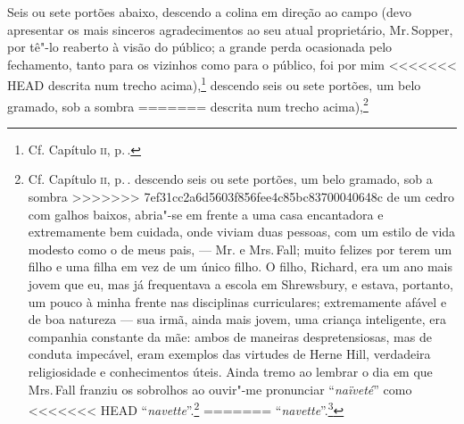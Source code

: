 {{{{{{{{{{{{{{{{{{{{{{{{{{{{{{Seis ou sete portões abaixo, descendo a colina em direção ao campo (devo
apresentar os mais sinceros agradecimentos ao seu atual proprietário, Mr.\,Sopper, por tê"-lo reaberto à visão do público; a grande perda ocasionada
pelo fechamento, tanto para os vizinhos como para o público, foi por mim
<<<<<<< HEAD
descrita num trecho acima),\footnote{Cf. Capítulo \textsc{ii}, p.\,\pageref{herne}.} descendo seis ou sete portões, um belo gramado, sob a sombra
=======
descrita num trecho acima),\footnote{Cf. Capítulo \textsc{ii}, p.\,\pageref{herne}.  descendo seis ou sete portões, um belo gramado, sob a sombra
>>>>>>> 7ef31cc2a6d5603f856fee4c85bc83700040648c
de um cedro com galhos baixos, abria"-se em frente a uma casa encantadora
e extremamente bem cuidada, onde viviam duas pessoas, com um estilo de
vida modesto como o de meus pais, --- Mr. e Mrs.\,Fall; muito felizes por
terem um filho e uma filha em vez de um único filho. O filho, Richard,
era um ano mais jovem que eu, mas já frequentava a escola em Shrewsbury,
e estava, portanto, um pouco à minha frente nas disciplinas
curriculares; extremamente afável e de boa natureza --- sua irmã, ainda
mais jovem, uma criança inteligente, era companhia constante da mãe:
ambos de maneiras despretensiosas, mas de conduta impecável, eram
exemplos das virtudes de Herne Hill, verdadeira religiosidade e
conhecimentos úteis. Ainda tremo ao lembrar o dia em que Mrs.\,Fall
franziu os sobrolhos ao ouvir"-me pronunciar ``\textit{naïveté}'' como
<<<<<<< HEAD
``\textit{navette}''.\footnote{\textit{Naïveté}: ingenuidade.}
=======
``\textit{navette}''.\footnote{\textit{Naïveté}: ingenuidade 
>>>>>>> 7ef31cc2a6d5603f856fee4c85bc83700040648c

Creio que foi em 1832 que meu pai, ao perceber, com grande
admiração, a conduta irrepreensível dessa família, escreveu a Mr.\,Fall,
solicitando cortesmente que fosse permitido aos ``dois garotos'', quando
Richard estivesse em casa, fazer suas tarefas de férias ou se divertirem
juntos, caso isso lhes comprouvesse. A proposta foi gentilmente aceita:
os dois garotos travaram conhecimento, --- concordaram com o proposto, ---
e, como nesta época eu tinha obtido a posse de um estúdio, todo para
mim, enquanto Richard dispunha apenas de seu próprio quarto (sujeito aos
conselhos e à intrusão fraterna), o curso que as coisas seguiram foi
que, geralmente, quando Richard estava em casa, ele subia a colina,
passando pelos setes portões, por volta das dez horas da manhã; fazia as
lições que tinha que fazer na mesma mesa que eu, ocasionalmente
ajudando"-me com as minhas; e então saíamos para um passeio vespertino
com Dash, Gipsy, ou qualquer um dos cães que estivesse disponível.

}}}}}}}}}}}}}}}}}}}}}}}}}}}}}}}}
